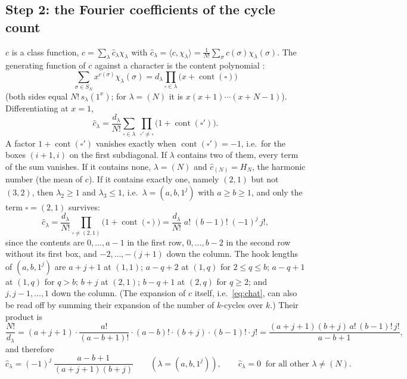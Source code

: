\documentclass[11pt]{amsart}
\theoremstyle{remark}
\newcommand{\SN}{S_N}
\newcommand{\cont}{\operatorname{cont}}
\begin{document}
\subsection*{Step 2: the Fourier coefficients of the cycle count}
$c$ is a class function, $c=\sum_\lambda\hat c_\lambda\chi_\lambda$ with $\hat c_\lambda=\langle c,\chi_\lambda\rangle=\frac1{N!}\sum_\sigma c(\sigma)\chi_\lambda(\sigma)$.  The generating function of $c$ against a character is the content polynomial \cite[Ch.~I, \S1 Ex.~11, \S3 Ex.~4 and \S7]{Mac95}:
\[
\sum_{\sigma\in\SN}x^{c(\sigma)}\chi_\lambda(\sigma)=d_\lambda\prod_{\square\in\lambda}\bigl(x+\cont(\square)\bigr)
\]
(both sides equal $N!\,s_\lambda(1^x)$; for $\lambda=(N)$ it is $x(x+1)\cdots(x+N-1)$).  Differentiating at $x=1$,
\[
\hat c_\lambda=\frac{d_\lambda}{N!}\sum_{\square\in\lambda}\ \prod_{\square'\ne\square}\bigl(1+\cont(\square')\bigr).
\]
A factor $1+\cont(\square')$ vanishes exactly when $\cont(\square')=-1$, i.e.\ for the boxes $(i+1,i)$ on the first subdiagonal.  If $\lambda$ contains two of them, every term of the sum vanishes.  If it contains none, $\lambda=(N)$ and $\hat c_{(N)}=H_N$, the harmonic number (the mean of $c$).  If it contains exactly one, namely $(2,1)$ but not $(3,2)$, then $\lambda_2\ge1$ and $\lambda_3\le1$, i.e.\ $\lambda=(a,b,1^j)$ with $a\ge b\ge1$, and only the term $\square=(2,1)$ survives:
\[
\hat c_\lambda=\frac{d_\lambda}{N!}\prod_{\square\ne(2,1)}\bigl(1+\cont(\square)\bigr)
=\frac{d_\lambda}{N!}\;a!\;(b-1)!\;(-1)^j\,j! ,
\]
since the contents are $0,\dots,a-1$ in the first row, $0,\dots,b-2$ in the second row without its first box, and $-2,\dots,-(j+1)$ down the column.  The hook lengths of $(a,b,1^j)$ are $a+j+1$ at $(1,1)$; $a-q+2$ at $(1,q)$ for $2\le q\le b$; $a-q+1$ at $(1,q)$ for $q>b$; $b+j$ at $(2,1)$; $b-q+1$ at $(2,q)$ for $q\ge2$; and $j,j-1,\dots,1$ down the column.  (The expansion of $c$ itself, i.e.\ \eqref{eq:chat}, can also be read off \cite[Thm.~3]{AK13} by summing their expansion of the number of $k$-cycles over $k$.)  Their product is
\[
\frac{N!}{d_\lambda}=(a+j+1)\cdot\frac{a!}{(a-b+1)!}\cdot(a-b)!\cdot(b+j)\cdot(b-1)!\cdot j!
=\frac{(a+j+1)(b+j)\,a!\,(b-1)!\,j!}{a-b+1},
\]
and therefore
\begin{equation}\label{eq:chat}
\hat c_\lambda=(-1)^j\,\frac{a-b+1}{(a+j+1)(b+j)}\qquad(\lambda=(a,b,1^j)),\qquad
\hat c_\lambda=0\ \text{ for all other }\lambda\ne(N).
\end{equation}
\end{document}
